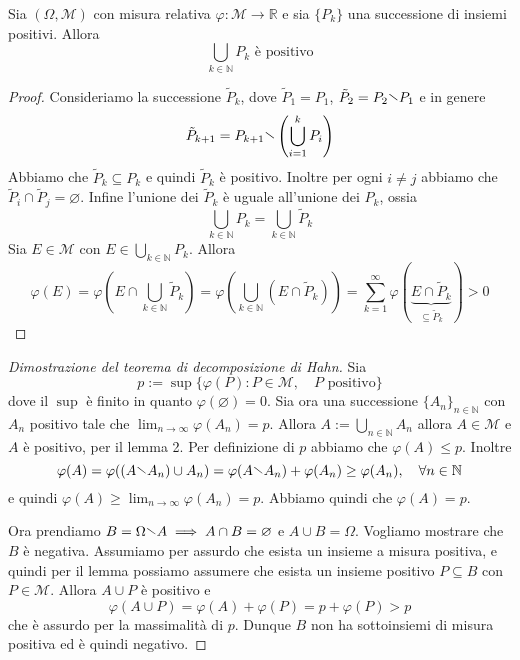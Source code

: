 \begin{lemma}
    Sia \((\Omega, \mathcal{M})\) con misura relativa \(\varphi : \mathcal{M}
    \to \mathbb{R}\) e sia \(\{P_k\} \) una successione di insiemi positivi.
    Allora 
    \[
        \bigcup_{k \in \mathbb{N}} P_k \text{ è positivo}
    \]
\end{lemma}
\begin{proof}
    Consideriamo la successione \({\tilde{P}_k}\), dove \(\tilde{P}_1 = P_{1}\),
    \(\tilde{P}_2 = P_{2} \sminus P_{1}\) e in genere
    \[
        \tilde{P}_{k+1}  = P_{k+1} \sminus \left( \bigcup_{i=1}^{k} P_{i}
            \right)
    \]
    Abbiamo che \(\tilde{P}_{k} \subseteq P_{k}\) e quindi \(\tilde{P}_{k}\) è
    positivo. Inoltre per ogni \(i \neq j\) abbiamo che \(\tilde{P}_{i} \cap
    \tilde{P}_{j} = \varnothing\). Infine l'unione dei \(\tilde{P}_{k}\) è
    uguale all'unione dei \(P_{k}\), ossia
    \[
        \bigcup_{k \in \mathbb{N}} P_k = \bigcup_{k \in \mathbb{N}} \tilde{P}_k 
    \]
    Sia \(E \in \mathcal{M}\) con \(E \in \bigcup_{k \in \mathbb{N}} P_k\).
    Allora
    \[
        \varphi(E) = \varphi\left(E \cap \bigcup_{k \in \mathbb{N}} \tilde{P}_k
        \right) = \varphi\left( \bigcup_{k \in \mathbb{N}} \left( E \cap
        \tilde{P}_k \right)   \right) = \sum_{k=1}^{\infty}
        \varphi(\underbrace{E \cap
        \tilde{P}_k}_{\subseteq \tilde{P}_k })  > 0
    \]
\end{proof}
\begin{proof}[Dimostrazione del teorema di decomposizione di Hahn]
    Sia
    \[
        p := \sup \{ \varphi(P) : P \in \mathcal{M}, \quad P \text{ positivo}\} 
    \]
    dove il \(\sup\) è finito in quanto \(\varphi(\varnothing) = 0\). Sia ora
    una successione \(\{A_{n}\}_{n \in \mathbb{N}} \) con \(A_{n}\) positivo
    tale che \(\lim_{n \to \infty} \varphi(A_{n}) = p\). Allora \(A := \bigcup_{n \in
    \mathbb{N}} A_{n}\)  allora \(A \in \mathcal{M}\) e \(A\) è positivo, per il
    lemma 2. Per definizione di \(p\) abbiamo che \(\varphi(A) \le p\). Inoltre
    \[
        \varphi(A) = \varphi((A \sminus A_{n}) \cup A_{n}) = \varphi(A \sminus
        A_{n}) + \varphi(A_{n}) \ge \varphi(A_{n}), \quad \forall n \in \mathbb{N}
    \]
    e quindi \(\varphi(A) \ge \lim_{n \to \infty} \varphi(A_{n}) =  p\). Abbiamo
    quindi che \(\varphi(A) = p\).

    Ora prendiamo \(B = \Omega \sminus A \implies A \cap B = \varnothing\) e \(A
    \cup B = \Omega\). Vogliamo mostrare che \(B\) è negativa. Assumiamo per
    assurdo che esista un insieme a misura positiva, e quindi per il lemma
    possiamo assumere che esista un insieme positivo \(P \subseteq B \) con \(P
    \in \mathcal{M}\). Allora \(A \cup P\) è positivo e 
    \[
        \varphi(A \cup P) = \varphi(A) + \varphi(P) = p + \varphi(P) > p
    \]
    che è assurdo per la massimalità di \(p\). Dunque \(B\) non ha sottoinsiemi
    di misura positiva ed è quindi negativo.
\end{proof}
